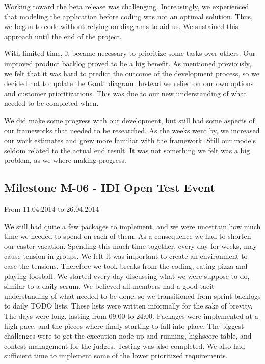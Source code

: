 Working toward the beta release was challenging. Increasingly, we
experienced that modeling the application before coding was not an
optimal solution. Thus, we began to code without relying on diagrams to
aid us. We sustained this approach until the end of the project.

With limited time, it became necessary to prioritize some tasks over
others. Our improved product backlog proved to be a
big benefit. As mentioned previously, we felt that it was hard to
predict the outcome of the development process, so we decided not to
update the Gantt diagram. Instead we relied on our own options and
customer prioritizations. This was due to our new understanding of what
needed to be completed when.

We did make some progress with our development, but still had some
aspects of our frameworks that needed to be researched. As the weeks went
by, we increased our work estimates and grew more familiar with the
framework. Still our models seldom related to the actual end result. It
was not something we felt was a big problem, as we where making progress.

\subsection{Milestone M-06 - IDI Open Test Event}
\label{sec:M06}
From 11.04.2014 to 26.04.2014

We still had quite a few packages to implement, and we were uncertain
how much time we needed to spend on each of them. As a consequence
we had to shorten our easter vacation. Spending this much time together,
every day for weeks, may cause tension in groups. We felt it was
important to create an environment to ease the tensions. Therefore we
took breaks from the coding, eating pizza and playing foosball. We started every day discussing what we were suppose to do, similar to a
daily scrum. We believed all members had a good tacit understanding of
what needed to be done, so we transitioned from sprint backlogs to
daily TODO lists. These lists were written informally for the sake of
brevity.\newline
\newline
The days were long, lasting from 09:00 to 24:00. Packages were
implemented at a high pace, and the pieces where finaly starting to fall into place. 
The biggest challenges were to get the execution node up and
running, highscore table, and contest management for the judges. Testing
was also completed. We also had sufficient time to implement some of
the lower prioritized requirements. 

